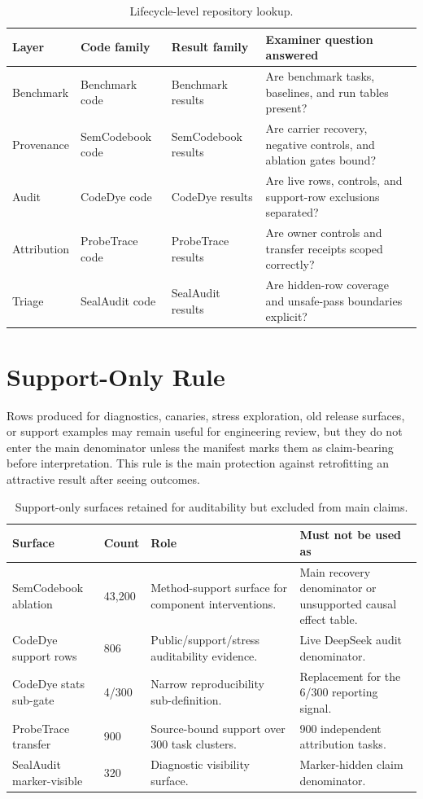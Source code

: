 \begin{table}[htbp]
\centering
\caption{Lifecycle-level repository lookup.}
\label{tab:repo-lookup}
\lookuptable
\begin{tabularx}{\textwidth}{@{}L{1.45cm}L{2.25cm}L{2.25cm}Y@{}}
\toprule
Layer & Code family & Result family & Examiner question answered \\
\midrule
Benchmark & Benchmark code & Benchmark results & Are benchmark tasks, baselines, and run tables present? \\
Provenance & SemCodebook code & SemCodebook results & Are carrier recovery, negative controls, and ablation gates bound? \\
Audit & CodeDye code & CodeDye results & Are live rows, controls, and support-row exclusions separated? \\
Attribution & ProbeTrace code & ProbeTrace results & Are owner controls and transfer receipts scoped correctly? \\
Triage & SealAudit code & SealAudit results & Are hidden-row coverage and unsafe-pass boundaries explicit? \\
\bottomrule
\end{tabularx}
\end{table}

\section{Support-Only Rule}

Rows produced for diagnostics, canaries, stress exploration, old release surfaces, or support examples may remain useful for engineering review, but they do not enter the main denominator unless the manifest marks them as claim-bearing before interpretation. This rule is the main protection against retrofitting an attractive result after seeing outcomes.

\begin{table}[htbp]
\centering
\caption{Support-only surfaces retained for auditability but excluded from main claims.}
\label{tab:support-only-ledger}
\tighttable
\begin{tabularx}{\textwidth}{@{}L{2.10cm}L{1.45cm}YY@{}}
\toprule
Surface & Count & Role & Must not be used as \\
\midrule
SemCodebook ablation & 43,200 & Method-support surface for component interventions. & Main recovery denominator or unsupported causal effect table. \\
CodeDye support rows & 806 & Public/support/stress auditability evidence. & Live DeepSeek audit denominator. \\
CodeDye stats sub-gate & 4/300 & Narrow reproducibility sub-definition. & Replacement for the 6/300 reporting signal. \\
ProbeTrace transfer & 900 & Source-bound support over 300 task clusters. & 900 independent attribution tasks. \\
SealAudit marker-visible & 320 & Diagnostic visibility surface. & Marker-hidden claim denominator. \\
\bottomrule
\end{tabularx}
\end{table}

